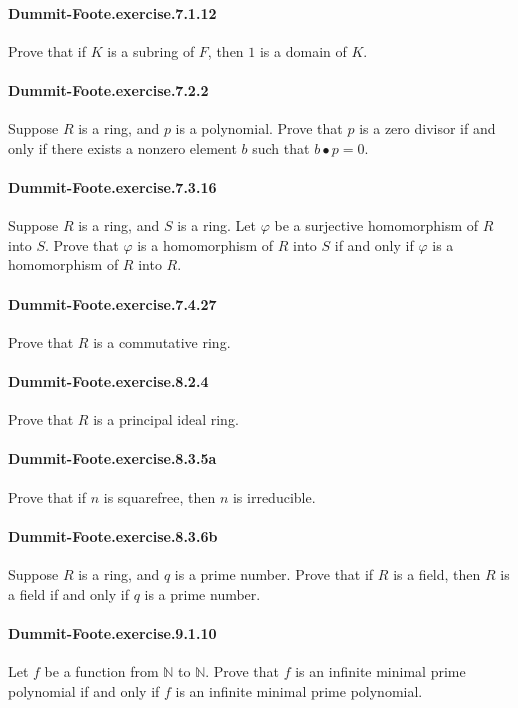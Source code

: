 \documentclass{article}
\begin{document}
\paragraph{Dummit-Foote.exercise.7.1.12} Prove that if $K$ is a subring of $F$, then $1$ is a domain of $K$.

\paragraph{Dummit-Foote.exercise.7.2.2} Suppose $R$ is a ring, and $p$ is a polynomial. Prove that $p$ is a zero divisor if and only if there exists a nonzero element $b$ such that $b • p = 0$.

\paragraph{Dummit-Foote.exercise.7.3.16} Suppose $R$ is a ring, and $S$ is a ring. Let $φ$ be a surjective homomorphism of $R$ into $S$. Prove that $φ$ is a homomorphism of $R$ into $S$ if and only if $φ$ is a homomorphism of $R$ into $R$.

\paragraph{Dummit-Foote.exercise.7.4.27} Prove that $R$ is a commutative ring.

\paragraph{Dummit-Foote.exercise.8.2.4} Prove that $R$ is a principal ideal ring.

\paragraph{Dummit-Foote.exercise.8.3.5a} Prove that if $n$ is squarefree, then $n$ is irreducible.

\paragraph{Dummit-Foote.exercise.8.3.6b} Suppose $R$ is a ring, and $q$ is a prime number. Prove that if $R$ is a field, then $R$ is a field if and only if $q$ is a prime number.

\paragraph{Dummit-Foote.exercise.9.1.10} Let $f$ be a function from $\mathbb{N}$ to $\mathbb{N}$. Prove that $f$ is an infinite minimal prime polynomial if and only if $f$ is an infinite minimal prime polynomial.
\end{document}
